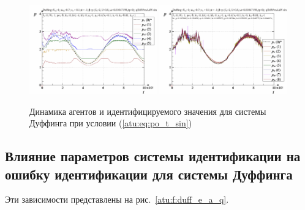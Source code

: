 \begin{figure}[ht!]
\begin{center}
  \includegraphics[width=0.49\textwidth]{p/cha/duff/duff_id-p_t_pi_ql3rlWvnAAW_sin.png}
  \hfill
  \includegraphics[width=0.49\textwidth]{p/cha/duff/duff_id-p_t_p_ql3rlWvnAAW_sin.png}
\end{center}
  \caption{Динамика агентов и идентифицируемого значения для системы Дуффинга при условии (\ref{atu:eq:po_t_sin})}
\label{atu:f:duff_id_sin}
\end{figure}



\subsection{Влияние параметров системы идентификации на ошибку идентификации для системы Дуффинга}  %

Эти зависимости представлены на рис.~\ref{atu:f:duff_e_a_q}.

